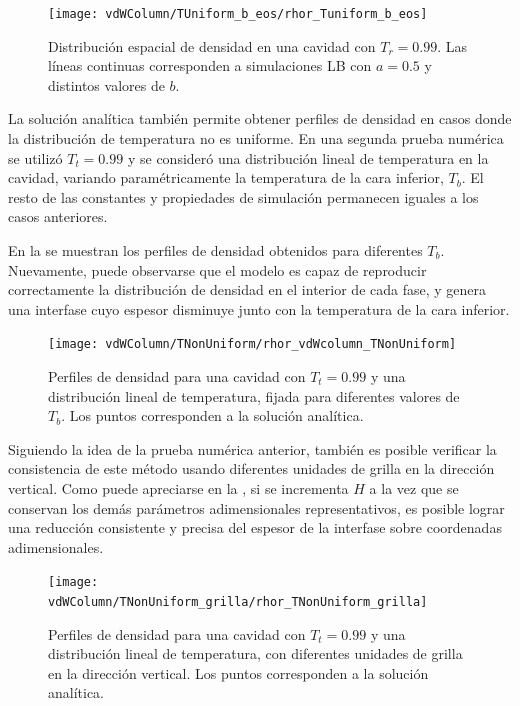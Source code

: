 \begin{figure}[ht]
	\centering
	\texttt{[image: vdWColumn/TUniform\_b\_eos/rhor\_Tuniform\_b\_eos]}
	\caption{Distribuci\'on espacial de densidad en una cavidad con $T_r = 0.99$. Las l\'ineas continuas corresponden a simulaciones LB con $a=0.5$ y distintos valores de $b$.}
	\label{fig:vdWColumn_b_eos}
\end{figure}
\FloatBarrier

La soluci\'on anal\'itica tambi\'en permite obtener perfiles de densidad en casos donde la distribuci\'on de temperatura no es uniforme. En una segunda prueba num\'erica se utiliz\'o $T_t=0.99$ y se consider\'o una distribuci\'on lineal de temperatura en la cavidad, variando param\'etricamente la temperatura de la cara inferior, $T_b$. El resto de las constantes y propiedades de simulaci\'on permanecen iguales a los casos anteriores.

En la  se muestran los perfiles de densidad obtenidos para diferentes $T_b$. Nuevamente, puede observarse que el modelo \pp{} es capaz de reproducir correctamente la distribuci\'on de densidad en el interior de cada fase, y genera una interfase cuyo espesor disminuye junto con la temperatura de la cara inferior.

\begin{figure}[ht]
	\centering
	\texttt{[image: vdWColumn/TNonUniform/rhor\_vdWcolumn\_TNonUniform]}
	\caption{Perfiles de densidad para una cavidad con $T_t = 0.99$ y una distribuci\'on lineal de temperatura, fijada para diferentes valores de $T_b$. Los puntos corresponden a la soluci\'on anal\'itica.}
	\label{fig:vdWColumn_rhor_TNonUniform}
\end{figure}

Siguiendo la idea de la prueba num\'erica anterior, tambi\'en es posible verificar la consistencia de este m\'etodo \pp{} usando diferentes unidades de grilla en la direcci\'on vertical. Como puede apreciarse en la , si se incrementa $H$ a la vez que se conservan los dem\'as par\'ametros adimensionales representativos, es posible lograr una reducci\'on consistente y precisa del espesor de la interfase sobre coordenadas adimensionales.

\begin{figure}[ht]
	\centering
	\texttt{[image: vdWColumn/TNonUniform\_grilla/rhor\_TNonUniform\_grilla]}
	\caption{Perfiles de densidad para una cavidad con $T_t = 0.99$ y una distribuci\'on lineal de temperatura, con diferentes unidades de grilla en la direcci\'on vertical. Los puntos corresponden a la soluci\'on anal\'itica.}
	\label{fig:vdWColumn_TNonUniform_grilla}
\end{figure}


